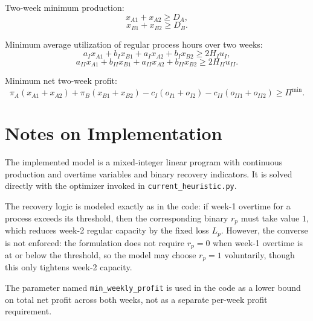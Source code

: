 Two-week minimum production:
\[
x_{A1}+x_{A2}\ge D_A,
\]
\[
x_{B1}+x_{B2}\ge D_B.
\]

Minimum average utilization of regular process hours over two weeks:
\[
a_I x_{A1}+b_I x_{B1}+a_I x_{A2}+b_I x_{B2}\ge 2H_Iu_I,
\]
\[
a_{II} x_{A1}+b_{II} x_{B1}+a_{II} x_{A2}+b_{II} x_{B2}\ge 2H_{II}u_{II}.
\]

Minimum net two-week profit:
\[
\pi_A(x_{A1}+x_{A2})+\pi_B(x_{B1}+x_{B2})
-c_I(o_{I1}+o_{I2})-c_{II}(o_{II1}+o_{II2})
\ge \Pi^{\min}.
\]

\section*{Notes on Implementation}

The implemented model is a mixed-integer linear program with continuous production and overtime variables and binary recovery indicators. It is solved directly with the optimizer invoked in \texttt{current\_heuristic.py}.

The recovery logic is modeled exactly as in the code: if week-1 overtime for a process exceeds its threshold, then the corresponding binary \(r_p\) must take value \(1\), which reduces week-2 regular capacity by the fixed loss \(L_p\). However, the converse is not enforced: the formulation does not require \(r_p=0\) when week-1 overtime is at or below the threshold, so the model may choose \(r_p=1\) voluntarily, though this only tightens week-2 capacity.

The parameter named \texttt{min\_weekly\_profit} is used in the code as a lower bound on total net profit across both weeks, not as a separate per-week profit requirement.
